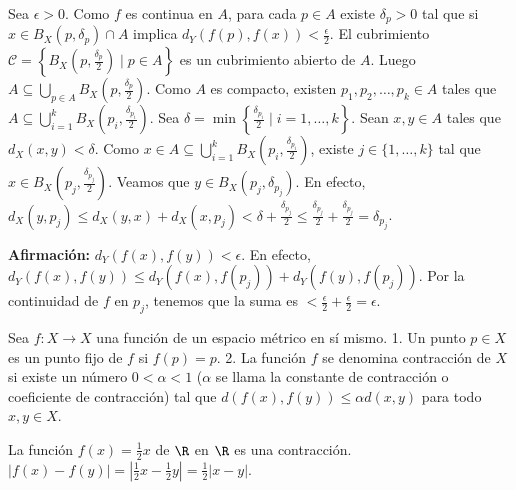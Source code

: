 \begin{dem}
Sea $\epsilon > 0$. Como $f$ es continua en $A$, para cada $p \in A$ existe $\delta_p > 0$ %
tal que si $x \in B_X(p, \delta_p) \cap A$ implica $d_Y(f(p), f(x)) < \frac{\epsilon}{2}$. %
El cubrimiento $\mathcal{C} = \left\{ B_X\left(p, \frac{\delta_p}{2}\right) \mid p \in A \right\}$ es un cubrimiento abierto de $A$. %
Luego $A \subseteq \bigcup_{p \in A} B_X\left(p, \frac{\delta_p}{2}\right)$. %
Como $A$ es compacto, existen $p_1, p_2, \dots, p_k \in A$ tales que %
$A \subseteq \bigcup_{i=1}^k B_X\left(p_i, \frac{\delta_{p_i}}{2}\right)$. %
Sea $\delta = \min \left\{ \frac{\delta_{p_i}}{2} \mid i = 1, \dots, k \right\}$. %
Sean $x, y \in A$ tales que $d_X(x, y) < \delta$. %
Como $x \in A \subseteq \bigcup_{i=1}^k B_X\left(p_i, \frac{\delta_{p_i}}{2}\right)$, existe $j \in \{1, \dots, k\}$ tal que $x \in B_X\left(p_j, \frac{\delta_{p_j}}{2}\right)$. %
Veamos que $y \in B_X(p_j, \delta_{p_j})$. %
En efecto, $d_X(y, p_j) \le d_X(y, x) + d_X(x, p_j) < \delta + \frac{\delta_{p_j}}{2} \le \frac{\delta_{p_j}}{2} + \frac{\delta_{p_j}}{2} = \delta_{p_j}$. %

\textbf{Afirmación:} $d_Y(f(x), f(y)) < \epsilon$. %
En efecto, $d_Y(f(x), f(y)) \le d_Y(f(x), f(p_j)) + d_Y(f(y), f(p_j))$. %
Por la continuidad de $f$ en $p_j$, tenemos que la suma es $< \frac{\epsilon}{2} + \frac{\epsilon}{2} = \epsilon$. %
\end{dem}

\begin{definicion} %
Sea $f: X \to X$ una función de un espacio métrico en sí mismo. %
1. Un punto $p \in X$ es un punto fijo de $f$ si $f(p) = p$. %
2. La función $f$ se denomina contracción de $X$ si existe un número $0 < \alpha < 1$ %
($\alpha$ se llama la constante de contracción o coeficiente de contracción) %
tal que $d(f(x), f(y)) \le \alpha d(x, y)$ para todo $x, y \in X$. %
\end{definicion}

\begin{example}
La función $f(x) = \frac{1}{2}x$ de $\R$ en $\R$ es una contracción. %
$|f(x) - f(y)| = \left| \frac{1}{2}x - \frac{1}{2}y \right| = \frac{1}{2}|x - y|$. %
\end{example}

